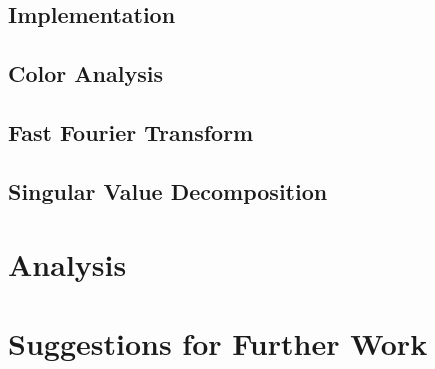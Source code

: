 \documentclass{report}
\begin{document}
\section{Implementation}
\section{Color Analysis}
\section{Fast Fourier Transform}
\section{Singular Value Decomposition}

\chapter{Analysis}

\chapter{Suggestions for Further Work}
\end{document}
